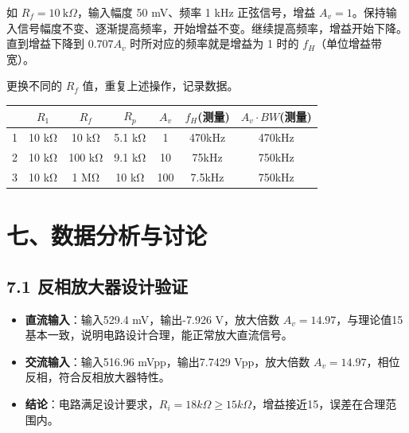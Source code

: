 \documentclass[12pt,a4paper]{article}
\begin{document}
如 \( R_f = 10\ \text{k}\Omega \)，输入幅度 50 mV、频率 1 kHz 正弦信号，增益 \( A_v = 1 \)。保持输入信号幅度不变、逐渐提高频率，开始增益不变。继续提高频率，增益开始下降。直到增益下降到 \( 0.707 A_v \) 时所对应的频率就是增益为 1 时的 \( f_H \)（单位增益带宽）。

更换不同的 \( R_f \) 值，重复上述操作，记录数据。



\begin{table}[h]
    \centering
    \begin{tabular}{|c|c|c|c|c|c|c|}
        \hline
        & \( R_1 \) & \( R_f \) & \( R_p \) & \( A_v \) & \( f_H \)(测量) & \( A_v \cdot BW \)(测量) \\
        \hline
        1 & 10 kΩ & 10 kΩ &5.1 kΩ &1 & 470kHz&470kHz \\
        \hline
        2 & 10 kΩ & 100 kΩ &9.1 kΩ &10 & 75kHz&750kHz \\
        \hline
        3 & 10 kΩ & 1 MΩ &10 kΩ &100 & 7.5kHz&750kHz \\
        \hline
    \end{tabular}
\end{table}








\section*{七、数据分析与讨论}

\subsection*{7.1 反相放大器设计验证}
\begin{itemize}
    \item \textbf{直流输入}：输入529.4 mV，输出-7.926 V，放大倍数 \( A_v = 14.97 \)，与理论值15基本一致，说明电路设计合理，能正常放大直流信号。
    \item \textbf{交流输入}：输入516.96 mVpp，输出7.7429 Vpp，放大倍数 \( A_v = 14.97 \)，相位反相，符合反相放大器特性。
    \item \textbf{结论}：电路满足设计要求，\( R_i = 18k\Omega \geq 15k\Omega \)，增益接近15，误差在合理范围内。
\end{itemize}
\end{document}
